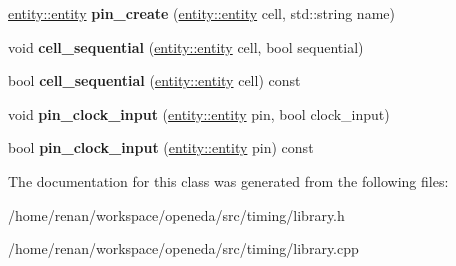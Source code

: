 \begin{DoxyCompactItemize}
\item 
\hypertarget{classophidian_1_1timing_1_1library_a0a980f67c4360ca8aa9bf13055fb90b2}{\hyperlink{classophidian_1_1entity_1_1entity}{entity\-::entity} {\bfseries pin\-\_\-create} (\hyperlink{classophidian_1_1entity_1_1entity}{entity\-::entity} cell, std\-::string name)}\label{classophidian_1_1timing_1_1library_a0a980f67c4360ca8aa9bf13055fb90b2}

\item 
\hypertarget{classophidian_1_1timing_1_1library_a6e03381495e1e32c755008b599d958f9}{void {\bfseries cell\-\_\-sequential} (\hyperlink{classophidian_1_1entity_1_1entity}{entity\-::entity} cell, bool sequential)}\label{classophidian_1_1timing_1_1library_a6e03381495e1e32c755008b599d958f9}

\item 
\hypertarget{classophidian_1_1timing_1_1library_a6f7ffe00a84533941b821962b518e6bb}{bool {\bfseries cell\-\_\-sequential} (\hyperlink{classophidian_1_1entity_1_1entity}{entity\-::entity} cell) const }\label{classophidian_1_1timing_1_1library_a6f7ffe00a84533941b821962b518e6bb}

\item 
\hypertarget{classophidian_1_1timing_1_1library_af22828047fda8cd05b0409d0b1bba055}{void {\bfseries pin\-\_\-clock\-\_\-input} (\hyperlink{classophidian_1_1entity_1_1entity}{entity\-::entity} pin, bool clock\-\_\-input)}\label{classophidian_1_1timing_1_1library_af22828047fda8cd05b0409d0b1bba055}

\item 
\hypertarget{classophidian_1_1timing_1_1library_aefbce0ea37e99aaf16808b6420b77764}{bool {\bfseries pin\-\_\-clock\-\_\-input} (\hyperlink{classophidian_1_1entity_1_1entity}{entity\-::entity} pin) const }\label{classophidian_1_1timing_1_1library_aefbce0ea37e99aaf16808b6420b77764}

\end{DoxyCompactItemize}


The documentation for this class was generated from the following files\-:\begin{DoxyCompactItemize}
\item 
/home/renan/workspace/openeda/src/timing/library.\-h\item 
/home/renan/workspace/openeda/src/timing/library.\-cpp\end{DoxyCompactItemize}
